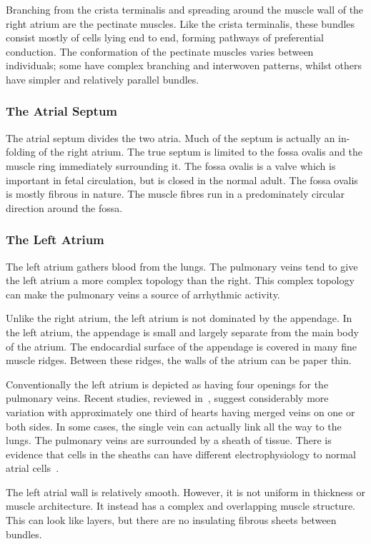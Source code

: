 Branching from the crista terminalis and spreading around the muscle wall of the
right atrium are the pectinate muscles.
Like the crista terminalis, these bundles consist mostly of cells lying end to
end, forming pathways of preferential conduction.
The conformation of the pectinate muscles varies between individuals; some have
complex branching and interwoven patterns, whilst others have simpler and
relatively parallel bundles.

\subsubsection{The Atrial Septum}

The atrial septum divides the two atria.
Much of the septum is actually an in-folding of the right atrium.
The true septum is limited to the fossa ovalis and the muscle ring immediately
surrounding it.
The fossa ovalis is a valve which is important in fetal circulation, but is
closed in the normal adult.
The fossa ovalis is mostly fibrous in nature.
The muscle fibres run in a predominately circular direction around the fossa.

\subsubsection{The Left Atrium}

The left atrium gathers blood from the lungs.
The pulmonary veins tend to give the left atrium a more complex topology than
the right.
This complex topology can make the pulmonary veins a source of arrhythmic
activity.

Unlike the right atrium, the left atrium is not dominated by the appendage.
In the left atrium, the appendage is small and largely separate from the main
body of the atrium.
The endocardial surface of the appendage is covered in many fine muscle ridges.
Between these ridges, the walls of the atrium can be paper thin.

Conventionally the left atrium is depicted as having four openings for the
pulmonary veins.
Recent studies, reviewed in~\cite{Ho2009}, suggest considerably more variation
with approximately one third of hearts having merged veins on one or both sides.
In some cases, the single vein can actually link all the way to the lungs.
The pulmonary veins are surrounded by a sheath of tissue.
There is evidence that cells in the sheaths can have different electrophysiology
to normal atrial cells~\cite{Jones2008}.

The left atrial wall is relatively smooth.
However, it is not uniform in thickness or muscle architecture.
It instead has a complex and overlapping muscle structure.
This can look like layers, but there are no insulating fibrous sheets between
bundles.

